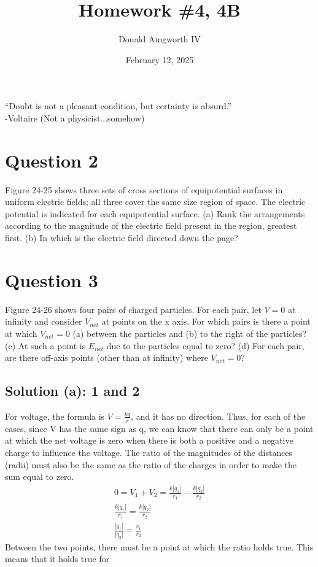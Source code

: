 \documentclass[12pt]{article}
\title{Homework \#4, 4B}
\author{Donald Aingworth IV}
\date{February 12, 2025}
\begin{document}

\begin{center}
    ``Doubt is not a pleasant condition, but certainty is absurd.'' \\-Voltaire (Not a physicist...somehow)
\end{center}

\section{Question 2}
Figure 24-25 shows three sets of cross sections of equipotential surfaces in uniform electric fields; all three cover the same size region of space. The electric potential is indicated for each equipotential surface. (a) Rank the arrangements according to the magnitude of the electric field present in the region, greatest first. (b) In which is the electric field directed down the
page?

\section{Question 3}
Figure 24-26 shows four pairs of charged particles. For each pair, let $V = 0$ at infinity and consider $V_{net}$ at points on the x axis. For which pairs is there a point at which $V_{net} = 0$ (a) between the particles and (b) to the right of the particles? (c) At such a point is $E_{net}$ due to the particles equal to zero? (d) For each pair, are there off-axis points (other than at infinity) where $V_{net} = 0$?

\subsection{Solution (a): 1 and 2}
For voltage, the formula is $V = \frac{kq}{r}$, and it has no direction. 
Thus, for each of the cases, since V has the same sign as q, we can know that there can only be a point at which the net voltage is zero when there is both a positive and a negative charge to influence the voltage.
The ratio of the magnitudes of the distances (radii) must also be the same as the ratio of the charges in order to make the sum equal to zero. 
\begin{gather*}
    0 = V_1 + V_2 = \frac{k\left|q_1\right|}{r_1} - \frac{k\left|q_2\right|}{r_2}\\
    \frac{k\left|q_1\right|}{r_1} = \frac{k\left|q_2\right|}{r_2}\\
    \frac{\left|q_1\right|}{\left|q_2\right|} = \frac{r_1}{r_2}
\end{gather*}
Between the two points, there must be a point at which the ratio holds true. 
This means that it holds true for 
\end{document}
